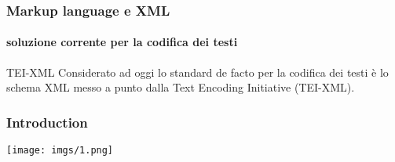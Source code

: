 \begin{frame}
	\frametitle{Markup language e XML}
	\framesubtitle{soluzione corrente per la codifica dei testi}
	\addtocounter{nframe}{1}

	\begin{block}{TEI-XML}
		Considerato ad oggi lo standard de facto per la codifica dei testi è lo schema XML messo a punto dalla Text Encoding Initiative (TEI-XML).
	\end{block}

\end{frame}

\begin{frame}
    \frametitle{Introduction}
    \addtocounter{nframe}{1}
    
    \begin{center}
        \texttt{[image: imgs/1.png]}
    \end{center}

\end{frame}

 
